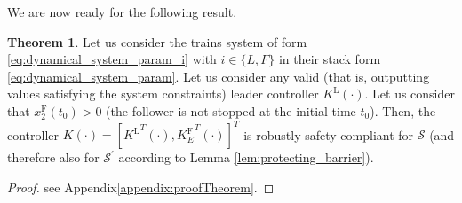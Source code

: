 \documentclass[letterpaper, 10 pt, conference]{ieeeconf}
\theoremstyle{definition}
\theoremstyle{nopoint}
\newtheorem{theorem}{Theorem}[section]
\newcounter{Theorem}
\begin{document}
We are now ready for the following result. 
\begin{theorem}\label{thm:trains_barrier}
Let us consider the trains system of form \eqref{eq:dynamical_system_param_i} with $i\in\{L,F\}$ in their stack form \eqref{eq:dynamical_system_param}. 
Let us consider any valid (that is, outputting values satisfying the system constraints) leader controller $K^\mathrm{L}(\cdot)$. Let us consider that $x_2^\mathrm{F}(t_0)>0$ (the follower is not stopped at the initial time $t_0$).
Then, the controller $K(\cdot)=[{K^\mathrm{L}}^T(\cdot), {K^\mathrm{F}_E}^T(\cdot)]^T$ is robustly safety compliant for $\mathcal{S}$ (and therefore also for $\mathcal{S}^\prime$ according to Lemma \ref{lem:protecting_barrier}).

\begin{proof}
	see Appendix\ref{appendix:proofTheorem}.
\end{proof}
%
%
%
%
%
%
%

\end{theorem}
\end{document}
